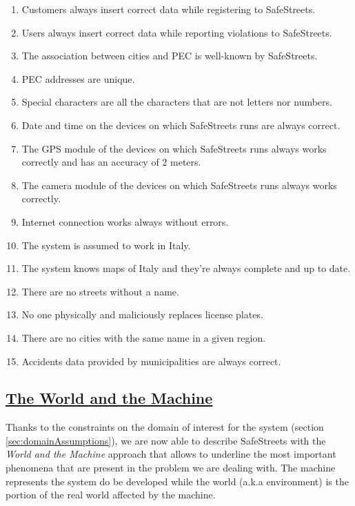 	\begin{enumerate}[label=\textbf{DA\arabic*}]
		\item \label{dom:correctRegistration} Customers always insert correct data while registering to SafeStreets.
		\item \label{dom:correctViolation} Users always insert correct data while reporting violations to SafeStreets.
		\item \label{dom:pecKnown} The association between cities and PEC is well-known by SafeStreets.
		\item \label{dom:uniquePec} PEC addresses are unique.
		\item \label{dom:specialCharacters} Special characters are all the characters that are not letters nor numbers.
		\item \label{dom:correctDateTime} Date and time on the devices on which SafeStreets runs are always correct.
		\item \label{dom:gpsAccuracy} The GPS module of the devices on which SafeStreets runs always works correctly and has an accuracy of 2 meters.
		\item \label{dom:correctCamera} The camera module of the devices on which SafeStreets runs always works correctly.
		\item \label{dom:correctInternet} Internet connection works always without errors.
		\item \label{dom:italy} The system is assumed to work in Italy.
		\item \label{dom:italyMaps} The system knows maps of Italy and they’re always complete and up to date.
		\item \label{dom:nonameStreets} There are no streets without a name.
		\item \label{dom:noMaliciousPlates} No one physically and maliciously replaces license plates.
		\item \label{dom:nosameCities} There are no cities with the same name in a given region.
		\item \label{dom:correctAccidents} Accidents data provided by municipalities are always correct.
	\end{enumerate} 
	
\subsection[The World and the Machine]{\hyperlink{toc}{The World and the Machine}}
	\label{sec:worldMachine}
	Thanks to the constraints on the domain of interest for the system (section \ref{sec:domainAssumptions}), we are now able to describe SafeStreets with the \textit{World and the Machine} approach that allows to underline the most important phenomena that are present in the problem we are dealing with. The machine represents the system do be developed while the world (a.k.a environment) is the portion of the real world affected by the machine.\\
	
